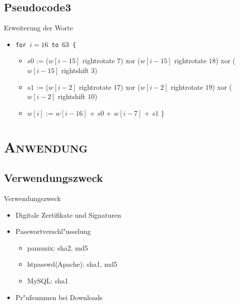 \documentclass[xcolor=x11names,compress]{beamer}
\renewcommand{\(}{\begin{columns}}
\renewcommand{\)}{\end{columns}}
\newcommand{\<}[1]{\begin{column}{#1}}
\renewcommand{\>}{\end{column}}
\begin{document}
\subsection{Pseudocode3}
\begin{frame}{Erweiterung der Worte}

\begin{itemize}

\item 
\texttt{for $i=16$ to $63$ \{}
		 \begin{itemize}
		 \item $s0$ := ($w[i-15]$ rightrotate $7$) xor ($w[i-15]$ rightrotate $18$) xor ($w[i-15]$ rightshift $3$) \newline
        \item $s1$ := ($w[i-2]$ rightrotate $17$) xor ($w[i-2]$ rightrotate $19$) xor ($w[i-2]$ rightshift $10$) \newline
        \item $w[i]$ := $w[i-16]$ + $s0$ + $w[i-7]$ + $s1$ \newline \}
		 \end{itemize}
         
\end{itemize}


\end{frame}
\section{\scshape Anwendung}
\subsection{Verwendungszweck}
\begin{frame}{Verwendungszweck}

\begin{itemize}
\item Digitale Zertifikate und Signaturen 
	\pause
\item Passwortverschl"usselung
\begin{itemize}
	\item pam\textunderscore unix: sha2, md5
	\item htpasswd(Apache): sha1, md5
	\item MySQL: sha1
\end{itemize}
\pause
\item Pr"ufsummen bei Downloads
\end{itemize}


\end{frame}
\end{document}
